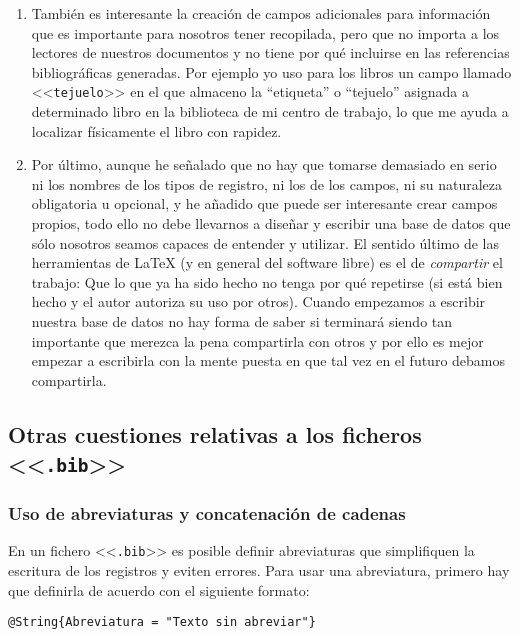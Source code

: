 \documentclass[a4paper,11pt]{article}
\def\ltx-{\LaTeX}
\def\ltr#1-{<<\texttt{#1}>>}
\def\tpf#1-{\ltr.#1-}
\begin{document}
\begin{enumerate}
\item  También   es  interesante  la  creación  de   campos  adicionales  para
  información que  es importante para  nosotros tener recopilada, pero  que no
  importa a los  lectores de nuestros documentos y no  tiene por qué incluirse
  en las  referencias bibliográficas  generadas. Por ejemplo  yo uso  para los
  libros un campo  llamado \ltr tejuelo- en el que  almaceno la ``etiqueta'' o
  ``tejuelo'' asignada  a determinado libro en  la biblioteca de  mi centro de
  trabajo, lo que me ayuda a localizar físicamente el libro con rapidez.

\item Por último, aunque he señalado que no hay que tomarse demasiado en serio
  ni  los nombres  de los  tipos de  registro,  ni los  de los  campos, ni  su
  naturaleza obligatoria  u opcional, y  he añadido que puede  ser interesante
  crear campos propios,  todo ello no debe llevarnos a  diseñar y escribir una
  base de  datos que sólo nosotros  seamos capaces de entender  y utilizar. El
  sentido  último de  las herramientas  de \ltx-  (y en  general  del software
  libre) es el de \emph{compartir} el trabajo:  Que lo que ya ha sido hecho no
  tenga por qué repetirse  (si está bien hecho y el autor  autoriza su uso por
  otros).  Cuando empezamos  a escribir nuestra base de datos  no hay forma de
  saber si terminará siendo tan importante que merezca la pena compartirla con
  otros y por  ello es mejor empezar  a escribirla con la mente  puesta en que
  tal vez en el futuro debamos compartirla.

\end{enumerate}

\subsection{Otras cuestiones relativas a los ficheros \tpf bib-}
\label{sec:otras-cuest-relat}

\subsubsection{Uso de abreviaturas y concatenación de cadenas}
\label{sec:uso-de-abreviaturas}

En un  fichero \tpf bib- es  posible definir abreviaturas  que simplifiquen la
escritura  de los  registros y  eviten  errores.  Para  usar una  abreviatura,
primero hay que definirla de acuerdo con el siguiente formato:
 
\verb|@String{Abreviatura = "Texto sin abreviar"}|
\end{document}
